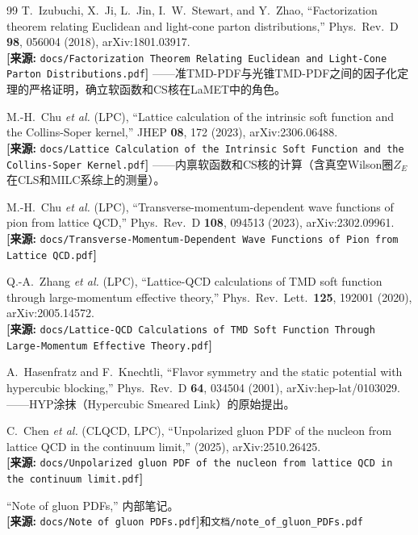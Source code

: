 \documentclass[12pt,a4paper]{ctexart}
\theoremstyle{definition}
\begin{document}
\begin{thebibliography}{99}
T.~Izubuchi, X.~Ji, L.~Jin, I.~W.~Stewart, and Y.~Zhao,
``Factorization theorem relating Euclidean and light-cone parton distributions,''
Phys.\ Rev.\ D \textbf{98}, 056004 (2018), arXiv:1801.03917.
\\\textbf{[来源:} \texttt{docs/Factorization Theorem Relating Euclidean and Light-Cone Parton Distributions.pdf}\textbf{]}
——准TMD-PDF与光锥TMD-PDF之间的因子化定理的严格证明，确立软函数和CS核在LaMET中的角色。

M.-H.~Chu \textit{et al.} (LPC),
``Lattice calculation of the intrinsic soft function and the Collins-Soper kernel,''
JHEP \textbf{08}, 172 (2023), arXiv:2306.06488.
\\\textbf{[来源:} \texttt{docs/Lattice Calculation of the Intrinsic Soft Function and the Collins-Soper Kernel.pdf}\textbf{]}
——内禀软函数和CS核的计算（含真空Wilson圈$Z_E$在CLS和MILC系综上的测量）。

M.-H.~Chu \textit{et al.} (LPC),
``Transverse-momentum-dependent wave functions of pion from lattice QCD,''
Phys.\ Rev.\ D \textbf{108}, 094513 (2023), arXiv:2302.09961.
\\\textbf{[来源:} \texttt{docs/Transverse-Momentum-Dependent Wave Functions of Pion from Lattice QCD.pdf}\textbf{]}

Q.-A.~Zhang \textit{et al.} (LPC),
``Lattice-QCD calculations of TMD soft function through large-momentum effective theory,''
Phys.\ Rev.\ Lett.\ \textbf{125}, 192001 (2020), arXiv:2005.14572.
\\\textbf{[来源:} \texttt{docs/Lattice-QCD Calculations of TMD Soft Function Through Large-Momentum Effective Theory.pdf}\textbf{]}

A.~Hasenfratz and F.~Knechtli,
``Flavor symmetry and the static potential with hypercubic blocking,''
Phys.\ Rev.\ D \textbf{64}, 034504 (2001), arXiv:hep-lat/0103029.
——HYP涂抹（Hypercubic Smeared Link）的原始提出。

C.~Chen \textit{et al.} (CLQCD, LPC),
``Unpolarized gluon PDF of the nucleon from lattice QCD in the continuum limit,''
(2025), arXiv:2510.26425.
\\\textbf{[来源:} \texttt{docs/Unpolarized gluon PDF of the nucleon from lattice QCD in the continuum limit.pdf}\textbf{]}

``Note of gluon PDFs,'' 内部笔记。
\\\textbf{[来源:} \texttt{docs/Note of gluon PDFs.pdf}\textbf{]}和\texttt{文档/note\_of\_gluon\_PDFs.pdf}

\end{thebibliography}
\end{document}
